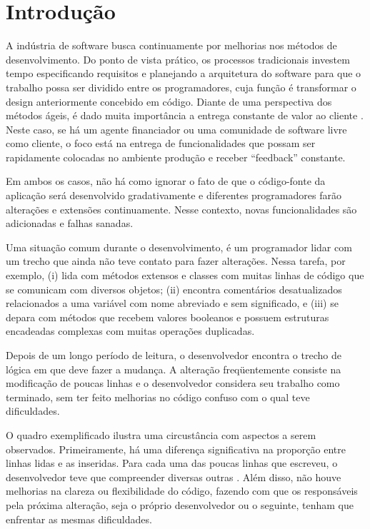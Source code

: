\chapter{Introdução}
\label{chap:introducao}

A indústria de software busca continuamente por melhorias nos métodos
de desenvolvimento. Do ponto de vista prático, os processos tradicionais investem tempo especificando requisitos
e planejando a arquitetura do software para que o trabalho possa ser dividido entre os
programadores, cuja função é transformar o design anteriormente concebido em código.
Diante de uma perspectiva dos métodos ágeis, é dado muita importância a entrega constante 
de valor ao cliente \citep{AgM2001}. Neste caso, se há um agente financiador ou uma comunidade de software livre
como cliente, o foco está na entrega de funcionalidades que possam ser rapidamente colocadas
no ambiente produção e receber ``feedback'' constante.

Em ambos os casos, não há como ignorar o fato de que o código-fonte da aplicação será
desenvolvido gradativamente e diferentes programadores farão alterações e extensões
continuamente. Nesse contexto, novas funcionalidades são adicionadas e falhas sanadas.

Uma situação comum durante o desenvolvimento, é um programador lidar com um trecho que
ainda não teve contato para fazer alterações. Nessa tarefa, por exemplo, (i) lida com métodos extensos e classes
com muitas linhas de código que se comunicam com diversos objetos; (ii) encontra comentários
desatualizados relacionados a uma variável com nome abreviado e sem significado, e (iii) se depara com métodos que
recebem valores booleanos e possuem estruturas encadeadas complexas com muitas operações duplicadas.

Depois de um longo período de leitura, o desenvolvedor encontra o trecho de lógica em que deve 
fazer a mudança. A alteração freqüentemente consiste na modificação de poucas linhas e o 
desenvolvedor considera seu trabalho como terminado, sem ter feito melhorias no código confuso
com o qual teve dificuldades.

O quadro exemplificado ilustra uma circustância com aspectos a serem observados.
Primeiramente, há uma diferença significativa na proporção entre linhas lidas e as inseridas.
Para cada uma das poucas linhas que escreveu, o desenvolvedor teve que compreender diversas
outras \citep{Beck2007}. Além disso, não houve melhorias na clareza ou flexibilidade do código, fazendo 
com que os responsáveis pela próxima alteração, seja o próprio desenvolvedor ou o seguinte,
tenham que enfrentar as mesmas dificuldades.

